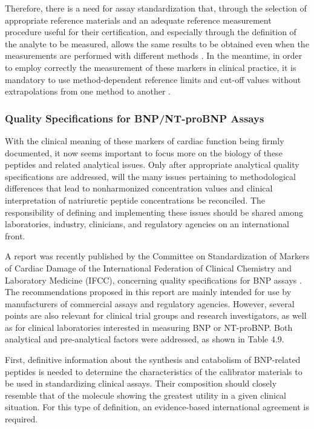 \documentclass[14pt,a4paper,onecolumn]{extarticle}
\begin{document}
Therefore, there is a need for assay standardization that, through the selection of
appropriate reference materials and an adequate reference measurement procedure
useful for their certification, and especially through the definition of the analyte to
be measured, allows the same results to be obtained even when the measurements are
performed with different methods \citep{bib286}. In the meantime, in order to employ correctly the measurement of these markers in clinical practice, it is mandatory to use
method-dependent reference limits and cut-off values without extrapolations from
one method to another \citep{bib287}.

\subsubsection{ Quality Specifications for BNP/NT-proBNP Assays}

With the clinical meaning of these markers of cardiac function being firmly documented, it now seems important to focus more on the biology of these peptides and
related analytical issues. Only after appropriate analytical quality specifications are
addressed, will the many issues pertaining to methodological differences that lead to nonharmonized concentration values and clinical interpretation of natriuretic peptide concentrations be reconciled. The responsibility of defining and implementing these issues
should be shared among laboratories, industry, clinicians, and regulatory agencies on
an international front.

A report was recently published by the Committee on Standardization of Markers of
Cardiac Damage of the International Federation of Clinical Chemistry and Laboratory Medicine (IFCC), concerning quality specifications for BNP assays \citep{bib288}. The recommendations proposed in this report are mainly intended for use by manufacturers of commercial assays and regulatory agencies. However, several points are also relevant for
clinical trial groups and research investigators, as well as for clinical laboratories interested in measuring BNP or NT-proBNP. Both analytical and pre-analytical factors were
addressed, as shown in Table 4.9.

First, definitive information about the synthesis and catabolism of BNP-related peptides is needed to determine the characteristics of the calibrator materials to be used in
standardizing clinical assays. Their composition should closely resemble that of the
molecule showing the greatest utility in a given clinical situation. For this type of definition, an evidence-based international agreement is required.
\end{document}
